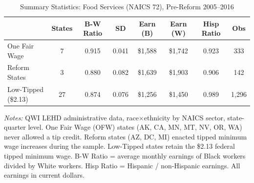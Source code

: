 \begin{table}[htbp]
\centering
\caption{Summary Statistics: Food Services (NAICS 72), Pre-Reform 2005--2016}
\label{tab:summary}
\begin{threeparttable}\small
\begin{tabular}{lccccccc}
\toprule
 & States & B-W Ratio & SD & Earn (B) & Earn (W) & Hisp Ratio & Obs \\
\midrule
One Fair Wage & 7 & 0.915 & 0.041 & \$1,588 & \$1,742 & 0.923 & 333 \\
Reform States & 3 & 0.880 & 0.082 & \$1,639 & \$1,903 & 0.906 & 142 \\
Low-Tipped (\$2.13) & 27 & 0.874 & 0.076 & \$1,256 & \$1,450 & 0.989 & 1,296 \\
\bottomrule
\end{tabular}
\begin{tablenotes}[flushleft]\footnotesize
\item \textit{Notes:} QWI LEHD administrative data, race$\times$ethnicity by NAICS sector, state-quarter level. One Fair Wage (OFW) states (AK, CA, MN, MT, NV, OR, WA) never allowed a tip credit. Reform states (AZ, DC, MI) enacted tipped minimum wage increases during the sample. Low-Tipped states retain the \$2.13 federal tipped minimum wage. B-W Ratio = average monthly earnings of Black workers divided by White workers. Hisp Ratio = Hispanic / non-Hispanic earnings. All earnings in current dollars.
\end{tablenotes}
\end{threeparttable}
\end{table}

